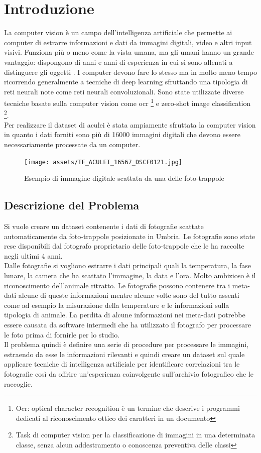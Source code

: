 \documentclass[12pt,a4paper,twoside]{article}
\begin{document}
\section{Introduzione}
La computer vision è un campo dell'intelligenza artificiale che permette ai computer di estrarre informazioni e dati da immagini digitali, video e altri input visivi. Funziona più o meno come la vista umana, ma gli umani hanno un grande vantaggio: dispongono di anni e anni di esperienza in cui si sono allenati a distinguere gli oggetti \cite{ibm-comp-vision}. I computer devono fare lo stesso ma in molto meno tempo ricorrendo generalmente a tecniche di deep learning sfruttando una tipologia di reti neurali note come reti neurali convoluzionali. Sono state utilizzate diverse tecniche basate sulla computer vision come ocr \footnote{Ocr: optical character recognition è un termine che descrive i programmi dedicati al riconoscimento ottico dei caratteri in un documento} e zero-shot image classification \footnote{Task di computer vision per la classificazione di immagini in una determinata classe, senza alcun addestramento o conoscenza preventiva delle classi}. \\ Per realizzare il dataset di aculei è stata ampiamente sfruttata la computer vision in quanto i dati forniti sono più di 16000 immagini digitali che devono essere necessariamente processate da un computer.

\begin{figure}[!ht]
    \centering
    \texttt{[image: assets/TF\_ACULEI\_16567\_DSCF0121.jpg]}
    \caption{Esempio di immagine digitale scattata da una delle foto-trappole}
    \label{fig:enter-label}
\end{figure}

\subsection{Descrizione del Problema}
Si vuole creare un dataset contenente i dati di fotografie scattate automaticamente da foto-trappole 
posizionate in Umbria. Le fotografie sono state rese disponibili dal fotografo proprietario delle foto-trappole che le ha raccolte negli ultimi 4 anni. \\ Dalle fotografie si vogliono estrarre i dati principali quali la temperatura, la fase lunare, la camera che ha scattato l'immagine, la data e l'ora. Molto ambizioso è il riconoscimento dell'animale ritratto. Le fotografie possono contenere tra i meta-dati alcune di queste informazioni mentre alcune volte sono del tutto assenti come ad esempio la misurazione della temperature e le informazioni sulla tipologia di animale. La perdita di alcune informazioni nei meta-dati potrebbe essere causata da software intermedi che ha utilizzato il fotografo per processare le foto prima di fornirle per lo studio. \\ Il problema quindi è definire una serie di procedure per processare le immagini, estraendo da esse le informazioni rilevanti e quindi creare un dataset sul quale applicare tecniche di intelligenza artificiale per identificare correlazioni tra le fotografie così da offrire un'esperienza coinvolgente sull'archivio fotografico che le raccoglie.
\end{document}
